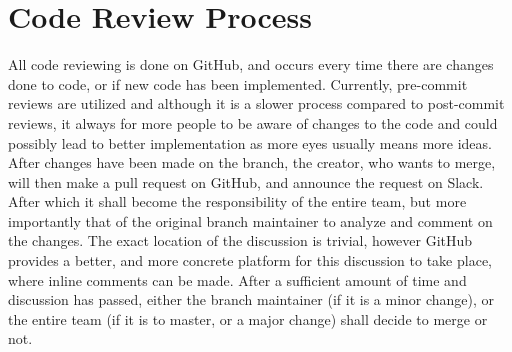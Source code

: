 \documentclass[12pt]{article}
\begin{document}
  \newpage
  \center\section{Code Review Process}
  \flushleft
All code reviewing is done on GitHub, and occurs every time there are changes done to code, or if new code has been implemented. Currently, pre-commit reviews are utilized and although it is a slower process compared to post-commit reviews, it always for more people to be aware of changes to the code and could possibly lead to better implementation as more eyes usually means more ideas. \newline
After changes have been made on the branch, the creator, who wants to merge, will then make a pull request on GitHub, and announce the request on Slack. After which it shall become the responsibility of the entire team, but more importantly that of the original branch maintainer to analyze and comment on the changes. The exact location of the discussion is trivial, however GitHub provides a better, and more concrete platform for this discussion to take place, where inline comments can be made. After a sufficient amount of time and discussion has passed, either the branch maintainer (if it is a minor change), or the entire team (if it is to master, or a major change) shall decide to merge or not.

  
\end{document}

